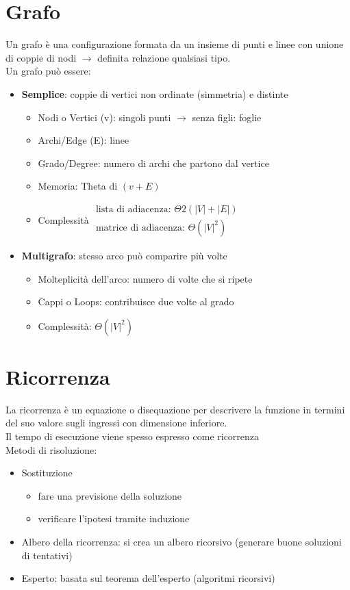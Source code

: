 \documentclass[12pt,a4paper]{article}
\begin{document}
\section{Grafo}
Un grafo è una configurazione formata da un insieme di punti e linee con unione di coppie di nodi $\rightarrow$ definita relazione qualsiasi tipo.\\
Un grafo può essere:
\begin{itemize}
\item \textbf{Semplice}: coppie di vertici non ordinate (simmetria) e distinte
\begin{itemize}
\item Nodi o Vertici (v): singoli punti $\rightarrow$ senza figli: foglie
\item Archi/Edge (E): linee
\item Grado/Degree: numero di archi che partono dal vertice
\item Memoria: Theta di $(v+E)$
\item Complessità $\begin{array}{l}\text{lista di adiacenza: } \Theta 2(|V|+|E|)\\\text{matrice di adiacenza: }\Theta(|V|^2)\end{array}$
\end{itemize}
\item \textbf{Multigrafo}: stesso arco può comparire più volte
\begin{itemize}
\item Molteplicità dell'arco: numero di volte che si ripete
\item Cappi o Loops: contribuisce due volte al grado
\item Complessità: $\Theta(|V|^2)$
\end{itemize}
\end{itemize}


\clearpage
\section{Ricorrenza}
La ricorrenza è un equazione o disequazione per descrivere la funzione in termini del suo valore sugli ingressi con dimensione inferiore.\\
Il tempo di esecuzione viene spesso espresso come ricorrenza\\
Metodi di risoluzione:
\begin{itemize}
\item Sostituzione
\begin{itemize}
\item fare una previsione della soluzione
\item verificare l'ipotesi tramite induzione
\end{itemize}
\item Albero della ricorrenza: si crea un albero ricorsivo (generare buone soluzioni di tentativi)
\item Esperto: basata sul teorema dell'esperto (algoritmi ricorsivi)
\end{itemize}
\end{document}
